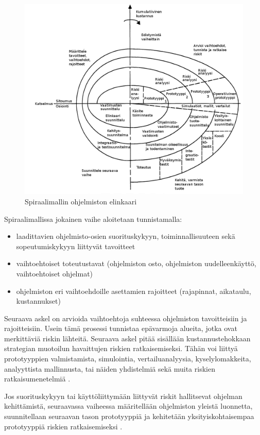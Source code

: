 \documentclass[finnish]{tktltiki2}
\theoremstyle{definition}
\theoremstyle{remark}
\begin{document}
{\begin{figure}[h!]

\caption{Spiraalimallin ohjelmiston elinkaari}
\centering
\includegraphics[width=\textwidth]{spiral}
\end{figure}

Spiraalimallissa jokainen vaihe aloitetaan tunnistamalla: \cite{BOE88}

\begin{itemize}
\item laadittavien ohjelmisto-osien suorituskykyyn, toiminnallisuuteen sekä sopeutumiskykyyn liittyvät tavoitteet
\item vaihtoehtoiset toteutustavat (ohjelmiston osto, ohjelmiston uudelleenkäyttö, vaihtoehtoiset ohjelmat)
\item ohjelmiston eri vaihtoehdoille asettamien rajoitteet (rajapinnat, aikataulu, kustannukset) \end{itemize}

Seuraava askel on arvioida vaihtoehtoja suhteessa ohjelmiston tavoitteisiin ja rajoitteisiin. Usein tämä prosessi tunnistaa epävarmoja alueita, jotka ovat merkittäviä riskin lähteitä. Seuraava askel pitää sisällään kustannustehokkaan strategian muotoilun havaittujen riskien ratkaisemiseksi. Tähän voi liittyä prototyyppien valmistamista, simulointia, vertailuanalyysia, kyselylomakkeita, analyyttista mallinnusta, tai näiden yhdistelmiä sekä muita riskien ratkaisumenetelmiä \cite{BOE88}.

Jos suorituskykyyn tai käyttöliittymään liittyvät riskit hallitsevat ohjelman kehittämistä, seuraavassa vaiheessa määritellään ohjelmiston yleistä luonnetta, suunnitellaan seuraavan tason prototyyppiä ja kehitetään yksityiskohtaisempaa prototyyppiä riskien ratkaisemiseksi \cite{BOE88}.

}
\end{document}
